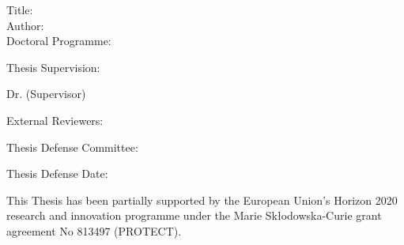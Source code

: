 
\begin{spacing}{1.3}
Title: \thesisTitle \\
Author: \thesisAuthor \\
Doctoral Programme:	 \DoctoralProgramme
\end{spacing}
Thesis Supervision: 
\begin{mydescription}
    \item Dr. \supervisorDetails  (Supervisor)
    \item \cosupervisorDetails
\end{mydescription}

\vspace{10 mm}
External Reviewers:

\vspace{30 mm}

Thesis Defense Committee:


\vspace{50mm}



Thesis Defense Date: 


\vspace{\fill}
\begin{spacing}{1.0}
This Thesis has been partially supported by the European Union's Horizon 2020 research and innovation programme under the Marie Skłodowska-Curie grant agreement No 813497 (PROTECT).
\end{spacing}

